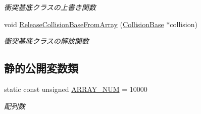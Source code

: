 \begin{DoxyCompactItemize}
\begin{DoxyCompactList}\small\item\em 衝突基底クラスの上書き関数 \end{DoxyCompactList}\item 
void \mbox{\hyperlink{class_collision_manager_a34318163f4256cebc7aefb95fc475030}{Release\+Collision\+Base\+From\+Array}} (\mbox{\hyperlink{class_collision_base}{Collision\+Base}} $\ast$collision)
\begin{DoxyCompactList}\small\item\em 衝突基底クラスの解放関数 \end{DoxyCompactList}\end{DoxyCompactItemize}
\subsection*{静的公開変数類}
\begin{DoxyCompactItemize}
\item 
static const unsigned \mbox{\hyperlink{class_collision_manager_addbc64e1fa0b01f3be07c897887f44ec}{A\+R\+R\+A\+Y\+\_\+\+N\+UM}} = 10000
\begin{DoxyCompactList}\small\item\em 配列数 \end{DoxyCompactList}\end{DoxyCompactItemize}
